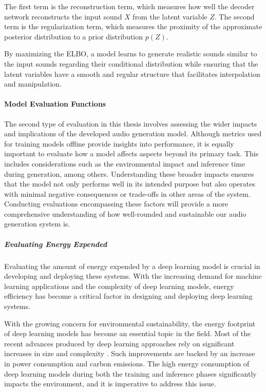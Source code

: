 The first term is the reconstruction term, which measures how well the decoder network reconstructs the input sound $X$ from the latent variable $Z$. The second term is the regularization term, which measures the proximity of the approximate posterior distribution to a prior distribution $p(Z)$.

By maximizing the \ac{ELBO}, a model learns to generate realistic sounds similar to the input sounds regarding their conditional distribution while ensuring that the latent variables have a smooth and regular structure that facilitates interpolation and manipulation.

\paragraph{Model Evaluation Functions}

The second type of evaluation in this thesis involves assessing the wider impacts and implications of the developed audio generation model. Although metrics used for training models offline provide insights into performance, it is equally important to evaluate how a model affects aspects beyond its primary task. This includes considerations such as the environmental impact and inference time during generation, among others. Understanding these broader impacts ensures that the model not only performs well in its intended purpose but also operates with minimal negative consequences or trade-offs in other areas of the system. Conducting evaluations encompassing these factors will provide a more comprehensive understanding of how well-rounded and sustainable our audio generation system is.

\subparagraph{Evaluating Energy Expended}

Evaluating the amount of energy expended by a deep learning model is crucial in developing and deploying these systems. With the increasing demand for machine learning applications and the complexity of deep learning models, energy efficiency has become a critical factor in designing and deploying deep learning systems.

With the growing concern for environmental sustainability, the energy footprint of deep learning models has become an essential topic in the field. Most of the recent advances produced by deep learning approaches rely on significant increases in size and complexity \cite{douwes_energy_2021}. Such improvements are backed by an increase in power consumption and carbon emissions. The high energy consumption of deep learning models during both the training and inference phases significantly impacts the environment, and it is imperative to address this issue.


